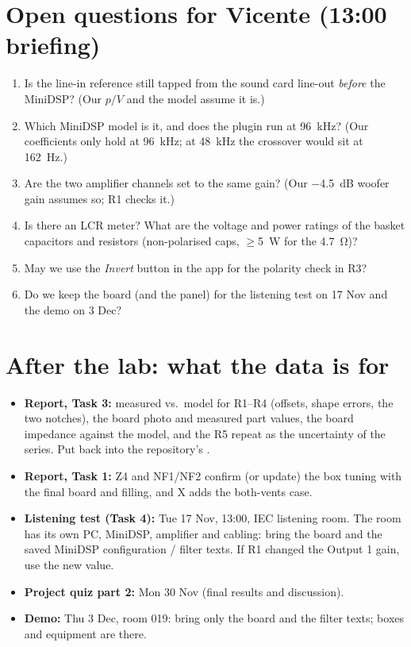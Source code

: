 \documentclass[a4paper,10pt]{article}
\newcommand{\file}[1]{\texttt{\detokenize{#1}}}
\begin{document}
\section{Open questions for Vicente (13:00 briefing)}\label{sec:questions}
\begin{enumerate}[leftmargin=16pt]
\item Is the line-in reference still tapped from the sound card line-out \emph{before} the MiniDSP?
  (Our $p/V$ and the model assume it is.)
\item Which MiniDSP model is it, and does the plugin run at \SI{96}{kHz}? (Our coefficients only hold at
  96~kHz; at 48~kHz the crossover would sit at \SI{162}{Hz}.)
\item Are the two amplifier channels set to the same gain? (Our \SI{-4.5}{dB} woofer gain assumes so;
  R1 checks it.)
\item Is there an LCR meter? What are the voltage and power ratings of the basket capacitors and
  resistors (non-polarised caps, $\geq$\SI{5}{W} for the \SI{4.7}{\ohm})?
\item May we use the \emph{Invert} button in the app for the polarity check in R3?
\item Do we keep the board (and the panel) for the listening test on 17 Nov and the demo on 3 Dec?
\end{enumerate}

\section{After the lab: what the data is for}
\begin{itemize}[leftmargin=14pt]
\item \textbf{Report, Task 3:} measured vs.\ model for R1--R4 (offsets, shape errors, the two notches),
  the board photo and measured part values, the board impedance against the model, and the R5 repeat as
  the uncertainty of the series. Put \file{data/} back into the repository's \file{lab-day/data/}.
\item \textbf{Report, Task 1:} Z4 and NF1/NF2 confirm (or update) the box tuning with the final board and
  filling, and X adds the both-vents case.
\item \textbf{Listening test (Task 4):} Tue 17 Nov, 13:00, IEC listening room. The room has its own PC,
  MiniDSP, amplifier and cabling: bring the board and the saved MiniDSP configuration / filter texts.
  If R1 changed the Output 1 gain, use the new value.
\item \textbf{Project quiz part 2:} Mon 30 Nov (final results and discussion).
\item \textbf{Demo:} Thu 3 Dec, room 019: bring only the board and the filter texts; boxes and equipment
  are there.
\end{itemize}
\end{document}
